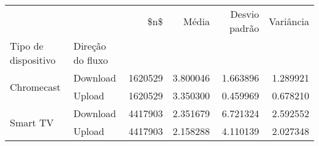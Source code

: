 \begin{tabular}{llrrrr}
\toprule
 &  & \$n\$ & Média & Desvio padrão & Variância \\
Tipo de dispositivo & Direção do fluxo &  &  &  &  \\
\midrule
\multirow[t]{2}{*}{Chromecast} & Download & 1620529 & 3.800046 & 1.663896 & 1.289921 \\
 & Upload & 1620529 & 3.350300 & 0.459969 & 0.678210 \\
\cline{1-6}
\multirow[t]{2}{*}{Smart TV} & Download & 4417903 & 2.351679 & 6.721324 & 2.592552 \\
 & Upload & 4417903 & 2.158288 & 4.110139 & 2.027348 \\
\cline{1-6}
\bottomrule
\end{tabular}
